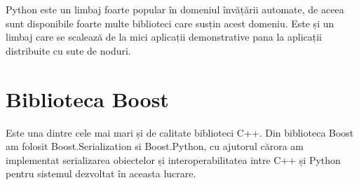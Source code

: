 Python este un limbaj foarte popular în domeniul învățării automate, de aceea sunt disponibile foarte multe biblioteci care susțin acest domeniu.
Este și un limbaj care se scalează de la mici aplicații demonstrative pana la aplicații distribuite cu sute de noduri.












\section{Biblioteca Boost}

Este una dintre cele mai mari și de calitate biblioteci C++.
Din biblioteca Boost am folosit Boost.Serialization si Boost.Python, cu ajutorul cărora am implementat serializarea obiectelor și interoperabilitatea intre C++ și Python pentru sistemul dezvoltat în aceasta lucrare.

